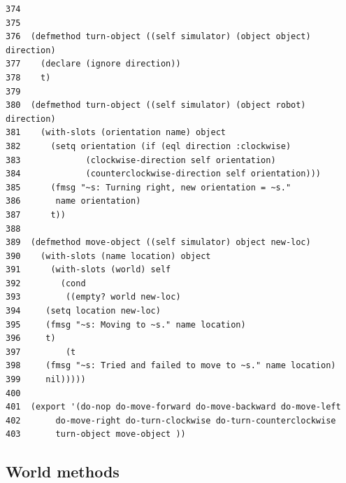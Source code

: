 \documentclass[11pt]{tufte-handout}
\begin{document}
\begin{enumerate}
\begin{verbatim}
374  
375  
376  (defmethod turn-object ((self simulator) (object object) direction)
377    (declare (ignore direction))
378    t)
379  
380  (defmethod turn-object ((self simulator) (object robot) direction)
381    (with-slots (orientation name) object
382      (setq orientation (if (eql direction :clockwise)
383  			(clockwise-direction self orientation)
384  			(counterclockwise-direction self orientation)))
385      (fmsg "~s: Turning right, new orientation = ~s." 
386  	  name orientation)
387      t))
388  
389  (defmethod move-object ((self simulator) object new-loc)
390    (with-slots (name location) object
391      (with-slots (world) self
392        (cond
393         ((empty? world new-loc)
394  	(setq location new-loc)
395  	(fmsg "~s: Moving to ~s." name location)
396  	t)
397         (t
398  	(fmsg "~s: Tried and failed to move to ~s." name location)
399  	nil)))))
400  
401  (export '(do-nop do-move-forward do-move-backward do-move-left
402  	  do-move-right do-turn-clockwise do-turn-counterclockwise 
403  	  turn-object move-object ))
\end{verbatim}
\end{enumerate}

\subsection{World methods}
\label{sec:orgc1cb60c}
\end{document}
